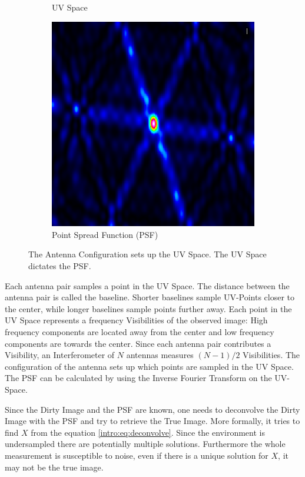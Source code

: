 \begin{figure}[h!]
\begin{subfigure}[b]{0.3\linewidth}
		\caption{UV Space}
	\end{subfigure}
	\begin{subfigure}[b]{0.3\linewidth}
	\includegraphics[width=\linewidth]{./chapters/01.intro/img/PSF.png}
	\caption{Point Spread Function (PSF)}
	\end{subfigure}
	\caption{The Antenna Configuration sets up the UV Space. The UV Space dictates the PSF.}
	\label{intro:ANT_UV_PSF}
\end{figure}

Each antenna pair samples a point in the UV Space. The distance between the antenna pair is called the baseline. Shorter baselines sample UV-Points closer to the center, while longer baselines sample points further away.  Each point in the UV Space represents a frequency Visibilities of the observed image: High frequency components are located away from the center and low frequency components are towards the center. Since each antenna pair contributes a Visibility, an Interferometer of $N$ antennas measures $(N-1)/2$ Visibilities. The configuration of the antenna sets up which points are sampled in the UV Space. The PSF can be calculated by using the Inverse Fourier Transform on the UV-Space.

Since the Dirty Image and the PSF are known, one needs to deconvolve the Dirty Image with the PSF and try to retrieve the True Image. More formally, it tries to find $X$ from the equation \eqref{intro:eq:deconvolve}. Since the environment is undersampled there are potentially multiple solutions. Furthermore the whole measurement is susceptible to noise, even if there is a unique solution for $X$, it may not be the true image. 

